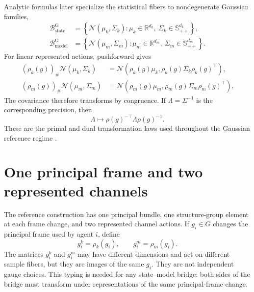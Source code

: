 Analytic formulas later specialize the statistical fibers to nondegenerate Gaussian families,
\begin{align}
\mathcal B_{\mathrm{state}}^{\mathrm G}
&=\left\{\mathcal N(\mu_k,\Sigma_k):
\mu_k\in\mathbb R^{d_k},\ \Sigma_k\in\mathbb S_{++}^{d_k}\right\},
\label{eq:gaussian-state-fiber}\\
\mathcal B_{\mathrm{model}}^{\mathrm G}
&=\left\{\mathcal N(\mu_m,\Sigma_m):
\mu_m\in\mathbb R^{d_m},\ \Sigma_m\in\mathbb S_{++}^{d_m}\right\}.
\label{eq:gaussian-model-fiber}
\end{align}
For linear represented actions, pushforward gives
\begin{align}
(\rho_k(g))_{\#}\mathcal N(\mu_k,\Sigma_k)
&=\mathcal N\left(\rho_k(g)\mu_k,
\rho_k(g)\Sigma_k\rho_k(g)^{\top}\right),
\label{eq:state-gaussian-pushforward}\\
(\rho_m(g))_{\#}\mathcal N(\mu_m,\Sigma_m)
&=\mathcal N\left(\rho_m(g)\mu_m,
\rho_m(g)\Sigma_m\rho_m(g)^{\top}\right).
\label{eq:model-gaussian-pushforward}
\end{align}
The covariance therefore transforms by congruence. If \(\Lambda=\Sigma^{-1}\) is the corresponding precision, then
\begin{equation}
\Lambda\longmapsto\rho(g)^{-\top}\Lambda\rho(g)^{-1}.
\label{eq:precision-dual-action}
\end{equation}
These are the primal and dual transformation laws used throughout the Gaussian reference regime \citep{HornJohnson2013,Bhatia2007}.

\section{One principal frame and two represented channels}

The reference construction has one principal bundle, one structure-group element at each frame change, and two represented channel actions. If \(g_i\in G\) changes the principal frame used by agent \(i\), define
\begin{equation}
g_i^k=\rho_k(g_i),
\qquad
g_i^m=\rho_m(g_i).
\label{eq:represented-frame-changes}
\end{equation}
The matrices \(g_i^k\) and \(g_i^m\) may have different dimensions and act on different sample fibers, but they are images of the same \(g_i\). They are not independent gauge choices. This typing is needed for any state--model bridge: both sides of the bridge must transform under representations of the same principal-frame change.


